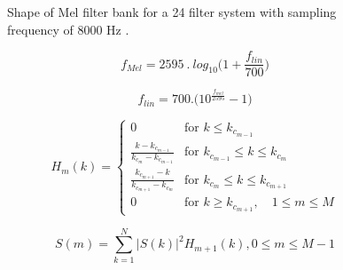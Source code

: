 \begin{spacing}{1.5}
\begin{figure}[ht]
\caption{Shape of Mel filter bank for a 24 filter system with sampling frequency of 8000 Hz .}
\label{Mel}
\end{figure} 

\begin{equation}
f_{Mel}=2595 ~.~ log_{10}\Big(1+\frac{f_{lin}}{700}\Big)
\label{hz2mel}
\end{equation}

\begin{equation}
f_{lin}=700.\Big(10^{\frac{f_{mel}}{2595}}-1\Big)
\label{Mel2hz}
\end{equation}

\begin{equation}
H_{m}(k) =
\begin{cases}
0 & \text{for $k \leq k_{c_{m-1}}$}\\
\frac{k-k_{c_{m-1}}}{k_{c_{m}}-k_{c_{m-1}}} & \text{for $k_{c_{m-1}} \leq k \leq k_{c_{m}}$} \\
\frac{k_{c_{m+1}}-k}{k_{c_{m+1}}-k_{c_{m}}} & \text{for $k_{c_{m}} \leq k \leq k_{c_{m+1}}$} \\
0 & \text{for $k \geq k_{c_{m+1}}$}, \quad 1 \leq m \leq M
\end{cases}
\label{trf}
\end{equation}

\begin{equation}
 \label{sMel}
 S(m)=\sum_{k=1}^{N}|S(k)|^{2}H_{m+1}(k), 0 \leq m \leq M-1
\end{equation}




\end{spacing}

